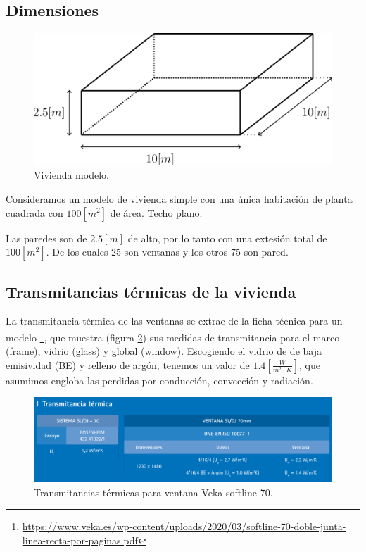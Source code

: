 \subsection{Dimensiones}

\begin{figure}[h] \centering
	\centering
	\includegraphics[width=1\textwidth]{./capitulos/resultados_discusion/images/modelo_vivienda.png}
	\caption{Vivienda modelo.}
	\label{fig:modelo_vivienda}
\end{figure}

Consideramos un modelo de vivienda simple con una única habitación de planta
cuadrada con $100[m^2]$ de área. Techo plano.

Las paredes son de $2.5[m]$ de alto, por lo tanto con una extesión total de
$100[m^2]$. De los cuales 25 son ventanas y los otros 75 son pared.


\subsection{Transmitancias térmicas de la vivienda}

La transmitancia térmica de las ventanas se extrae de la ficha técnica para un
modelo
\footnote{\url{https://www.veka.es/wp-content/uploads/2020/03/softline-70-doble-junta-linea-recta-por-paginas.pdf}},
que muestra (figura \ref{fig:window_tranmittance}) sus medidas de transmitancia
para el marco (frame), vidrio (glass) y global (window). Escogiendo el vidrio
de de baja emisividad (BE) y relleno de argón, tenemos un valor de
$1.4\left[\frac{W}{m^2 \cdot K}\right]$, que asumimos engloba las perdidas por
conducción, convección y radiación.

\begin{figure}[h] \centering
	\centering
	\includegraphics[width=1\textwidth]{./capitulos/resultados_discusion/images/window_transmittance.png}
	\caption{Transmitancias térmicas para ventana Veka softline 70.}
	\label{fig:window_tranmittance}
\end{figure}


